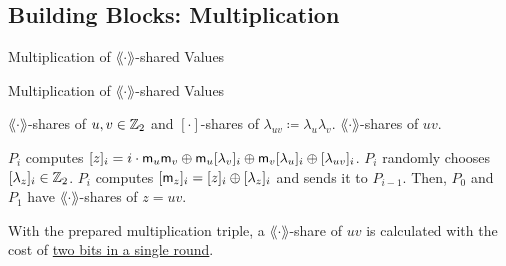 \documentclass[../240906_cryptlab_flute.tex]{subfiles}
\begin{document}
\subsection{Building Blocks: Multiplication}
\begin{frame}{Multiplication of \(\lang\cdot\rang\)-shared Values}

    \begin{block}{Multiplication of \(\lang\cdot\rang\)-shared Values}
        \begin{description}[Output]
            \ii[Input]
            \(\lang\cdot\rang\)-shares of \(u, v \in \mathbb{Z}_2\)
            and \([\cdot]\)-shares of \(\lambda_{uv} \coloneqq \lambda_u \lambda_v\).
            \ii[Output]
            \(\lang\cdot\rang\)-shares of \(uv\).
        \end{description}
        \pause
        \begin{enumerate}
            \ii
            \(P_i\) computes \([z]_i = i \cdot \mathsf{m}_u \mathsf{m}_v
            \oplus \mathsf{m}_u[\lambda_v]_i \oplus \mathsf{m}_v [\lambda_u]_i \oplus [\lambda_{uv}]_i\).
            \pause
            \ii
            \(P_i\) randomly chooses \([\lambda_z]_i \in \mathbb{Z}_2\).
            \ii
            \(P_i\) computes \([\mathsf{m}_z]_i = [z]_i \oplus [\lambda_z]_i\)
            and sends it to \(P_{i-1}\).
            \ii
            Then, \(P_0\) and \(P_1\) have \(\lang\cdot\rang\)-shares of \(z = uv\).
        \end{enumerate}
        \pause
        With the prepared multiplication triple,
        a \(\lang\cdot\rang\)-share of \(uv\) is calculated with the cost of \ul{two bits in a single round}.
    \end{block}
\end{frame}
\end{document}
